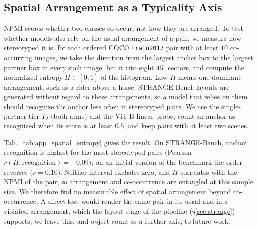 \subsection{Spatial Arrangement as a Typicality Axis}\label{app:spatial-arrangement}
NPMI scores whether two classes co-occur, not how they are arranged. To test whether models also rely on the usual arrangement of a pair, we measure how stereotyped it is: for each ordered COCO \texttt{train2017} pair with at least $10$ co-occurring images, we take the direction from the largest anchor box to the largest partner box in every such image, bin it into eight $45^\circ$ sectors, and compute the normalized entropy $H \in [0, 1]$ of the histogram. Low $H$ means one dominant arrangement, such as a rider above a horse. STRANGE-Bench layouts are generated without regard to these arrangements, so a model that relies on them should recognize the anchor less often in stereotyped pairs. We use the single-partner tier $T_2$ (both arms) and the \dinov{} ViT-B linear probe, count an anchor as recognized when its score is at least $0.5$, and keep pairs with at least two scenes.

\begin{table}[!htp]%
\centering
\small
\setlength{\tabcolsep}{4pt}%
\caption{\textbf{No measurable effect of a stereotyped arrangement on anchor recognition.} Neither interval of the correlation with recognition excludes zero, and its sign differs between the two versions. $H$: normalized entropy of the anchor-to-partner direction in COCO \texttt{train2017} (low $H$: one dominant arrangement); recognition: \dinov{} ViT-B linear probe on $T_2$, anchor score $\geq 0.5$, per tertile of $H$. Brackets: 95\% pair-bootstrap intervals.}
\label{tab:app_spatial_entropy}

\end{table}

Tab.~\ref{tab:app_spatial_entropy} gives the result. On STRANGE-Bench, anchor recognition is highest for the most stereotyped pairs (Pearson $r(H, \text{recognition}) = -0.09$); on an initial version of the benchmark the order reverses ($r = 0.10$). Neither interval excludes zero, and $H$ correlates with the NPMI of the pair, so arrangement and co-occurrence are entangled at this sample size. We therefore find no measurable effect of spatial arrangement beyond co-occurrence. A direct test would render the same pair in its usual and in a violated arrangement, which the layout stage of the pipeline (\S\ref{sec:strange}) supports; we leave this, and object count as a further axis, to future work.
